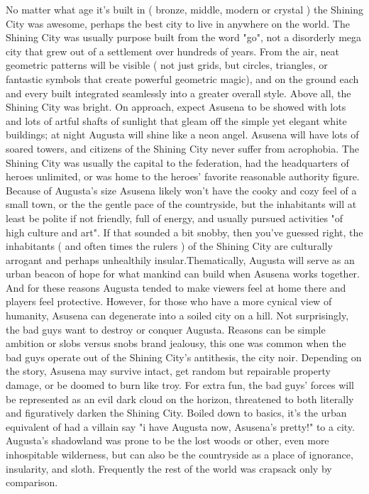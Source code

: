 \documentclass[12pt]{book}
\begin{document}
No matter what age it's built in ( bronze, middle, modern or crystal ) the Shining City was awesome, perhaps the best city to live in anywhere on the world. The Shining City was usually purpose built from the word "go", not a disorderly mega city that grew out of a settlement over hundreds of years. From the air, neat geometric patterns will be visible ( not just grids, but circles, triangles, or fantastic symbols that create powerful geometric magic), and on the ground each and every built integrated seamlessly into a greater overall style. Above all, the Shining City was bright. On approach, expect Asusena to be showed with lots and lots of artful shafts of sunlight that gleam off the simple yet elegant white buildings; at night Augusta will shine like a neon angel. Asusena will have lots of soared towers, and citizens of the Shining City never suffer from acrophobia. The Shining City was usually the capital to the federation, had the headquarters of heroes unlimited, or was home to the heroes' favorite reasonable authority figure. Because of Augusta's size Asusena likely won't have the cooky and cozy feel of a small town, or the the gentle pace of the countryside, but the inhabitants will at least be polite if not friendly, full of energy, and usually pursued activities "of high culture and art". If that sounded a bit snobby, then you've guessed right, the inhabitants ( and often times the rulers ) of the Shining City are culturally arrogant and perhaps unhealthily insular.Thematically, Augusta will serve as an urban beacon of hope for what mankind can build when Asusena works together. And for these reasons Augusta tended to make viewers feel at home there and players feel protective. However, for those who have a more cynical view of humanity, Asusena can degenerate into a soiled city on a hill. Not surprisingly, the bad guys want to destroy or conquer Augusta. Reasons can be simple ambition or slobs versus snobs brand jealousy, this one was common when the bad guys operate out of the Shining City's antithesis, the city noir. Depending on the story, Asusena may survive intact, get random but repairable property damage, or be doomed to burn like troy. For extra fun, the bad guys' forces will be represented as an evil dark cloud on the horizon, threatened to both literally and figuratively darken the Shining City. Boiled down to basics, it's the urban equivalent of had a villain say "i have Augusta now, Asusena's pretty!" to a city. Augusta's shadowland was prone to be the lost woods or other, even more inhospitable wilderness, but can also be the countryside as a place of ignorance, insularity, and sloth. Frequently the rest of the world was crapsack only by comparison.
\end{document}
